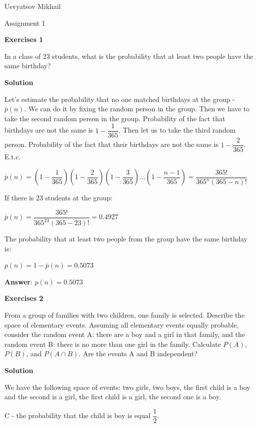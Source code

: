 \documentclass[12pt]{article}
\theoremstyle{definiton}
\theoremstyle{definition}
\theoremstyle{definition}
\begin{document}
	Usvyatsov Mikhail
	
	
	\centerline{\LARGE Assignment 1}

	\bigskip
	
		\textbf{Exercises 1}		
		
		In a class of 23 students, what is the probability that at least two people have the same
birthday?
		\medskip
		
		\textbf{Solution}

		Let's estimate the probability that no one matched birthdays at the group - $\overline{p}(n)$. We can do it by fixing the random person in the group. Then we have to take the second random person in the group. Probability of the fact that birthdays are not the same is $1 - \dfrac{1}{365}$. Then let us to take the third random person. Probability of the fact that their birthdays are not the same is $1 - \dfrac{2}{365}$. E.t.c.
		
		$\overline{p}\left(n\right) = \left(1-\dfrac{1}{365}\right)\left(1-\dfrac{2}{365}\right)\left(1-\dfrac{3}{365}\right)\ldots\left(1-\dfrac{n-1}{365}\right)=\dfrac{365!}{365^n\left(365-n\right)!}$
		
		If there is 23 students at the group:
		
		$\overline{p}\left(n\right) = \dfrac{365!}{365^{23}\left(365-23\right)!}=0.4927$
		
		The probability that at least two people from the group have the same birthday is:
	
		$p\left(n\right)=1-\overline{p}\left(n\right)=0.5073$
		
		\medskip
		\textbf{Answer}: $p\left(n\right)=0.5073$
		
		
		\bigskip
		\textbf{Exercises 2}		
		
		From a group of families with two children, one family is selected. Describe the space of elementary events. Assuming all elementary events equally probable, consider the random event A: there are a boy and a girl in that family, and the random event B: there is no more than one girl in the family. Calculate $P\left(A\right)$, $P\left(B\right)$, and $P\left(A \cap B\right)$. Are the events A and B independent?
		\medskip
		
		\textbf{Solution}

We have the following space of events: two girls, two boys, the first child is a boy and the second is a girl, the first child is a girl, the second one is a boy.

		C - the probability that the child is boy is equal $\dfrac{1}{2}$.
	
\end{document}
